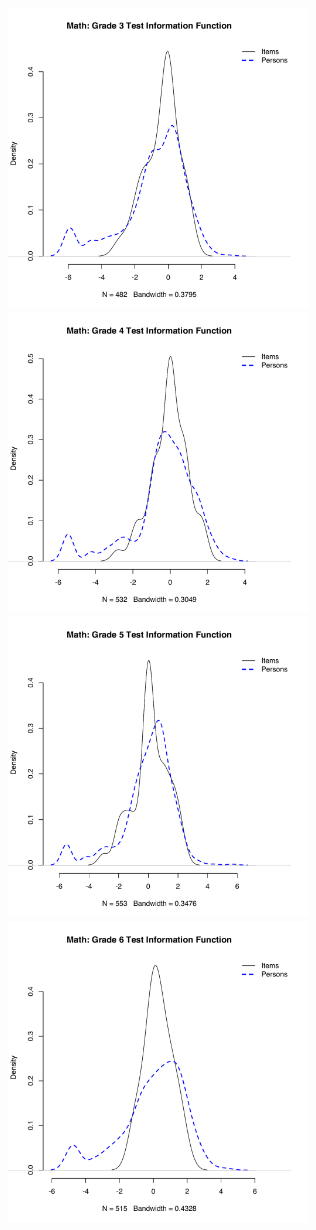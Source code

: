 \documentclass[]{article}
\begin{document}
\FloatBarrier

\includegraphics[width=\textwidth,height=3.125in]{ipdens/math3ipdens.pdf}
\includegraphics[width=\textwidth,height=3.125in]{ipdens/math4ipdens.pdf}
\includegraphics[width=\textwidth,height=3.125in]{ipdens/math5ipdens.pdf}
\includegraphics[width=\textwidth,height=3.125in]{ipdens/math6ipdens.pdf}
\end{document}
